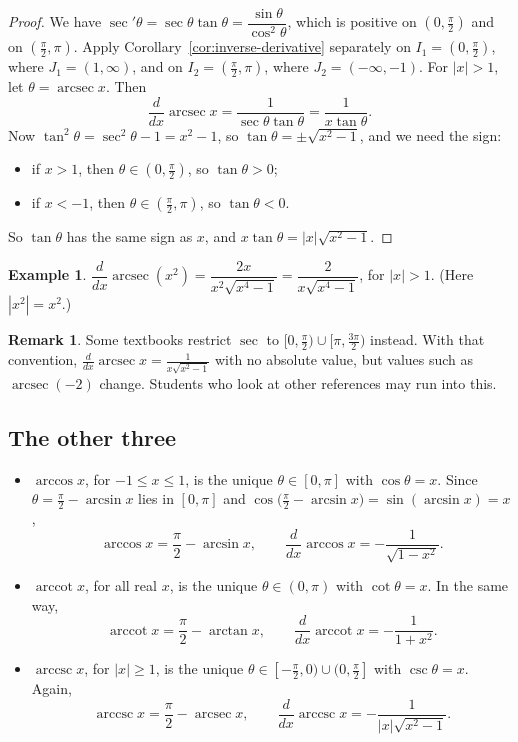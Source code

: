 \documentclass[12pt,letterpaper]{article}
\theoremstyle{definition}
\newtheorem{example}[theorem]{Example}
\newtheorem*{remark}{Remark}
\DeclareMathOperator{\arcsec}{arcsec}
\DeclareMathOperator{\arccot}{arccot}
\DeclareMathOperator{\arccsc}{arccsc}
\begin{document}
\begin{proof}
  We have $\sec'\theta=\sec\theta\tan\theta=\dfrac{\sin\theta}{\cos^2\theta}$,
  which is positive on $(0,\frac\pi2)$ and on $(\frac\pi2,\pi)$. Apply
  Corollary~\ref{cor:inverse-derivative} separately on $I_1=(0,\frac\pi2)$,
  where $J_1=(1,\infty)$, and on $I_2=(\frac\pi2,\pi)$, where
  $J_2=(-\infty,-1)$. For $|x|>1$, let $\theta=\arcsec x$. Then
  \[
    \frac{d}{dx}\arcsec x=\frac{1}{\sec\theta\tan\theta}
      =\frac{1}{x\tan\theta}.
  \]
  Now $\tan^2\theta=\sec^2\theta-1=x^2-1$, so
  $\tan\theta=\pm\sqrt{x^2-1}$, and we need the sign:
  \begin{itemize}[itemsep=0.2em]
    \item if $x>1$, then $\theta\in(0,\frac\pi2)$, so $\tan\theta>0$;
    \item if $x<-1$, then $\theta\in(\frac\pi2,\pi)$, so $\tan\theta<0$.
  \end{itemize}
  So $\tan\theta$ has the same sign as $x$, and
  $x\tan\theta=|x|\sqrt{x^2-1}$.
\end{proof}

\begin{example}
  $\dfrac{d}{dx}\arcsec(x^2)=\dfrac{2x}{x^2\sqrt{x^4-1}}
  =\dfrac{2}{x\sqrt{x^4-1}}$, for $|x|>1$. (Here $|x^2|=x^2$.)
\end{example}

\begin{remark}
  Some textbooks restrict $\sec$ to $[0,\frac\pi2)\cup[\pi,\frac{3\pi}{2})$
  instead. With that convention, $\frac{d}{dx}\arcsec x=\frac{1}{x\sqrt{x^2-1}}$
  with no absolute value, but values such as $\arcsec(-2)$ change. Students
  who look at other references may run into this.
\end{remark}

\subsection{The other three}

\begin{itemize}[itemsep=0.4em]
  \item $\arccos x$, for $-1\leq x\leq1$, is the unique $\theta\in[0,\pi]$
    with $\cos\theta=x$. Since $\theta=\frac\pi2-\arcsin x$ lies in $[0,\pi]$
    and $\cos\bigl(\frac\pi2-\arcsin x\bigr)=\sin(\arcsin x)=x$,
    \[
      \arccos x=\frac\pi2-\arcsin x,
      \qquad
      \frac{d}{dx}\arccos x=-\frac{1}{\sqrt{1-x^2}}.
    \]
  \item $\arccot x$, for all real $x$, is the unique $\theta\in(0,\pi)$ with
    $\cot\theta=x$. In the same way,
    \[
      \arccot x=\frac\pi2-\arctan x,
      \qquad
      \frac{d}{dx}\arccot x=-\frac{1}{1+x^2}.
    \]
  \item $\arccsc x$, for $|x|\geq1$, is the unique
    $\theta\in[-\frac\pi2,0)\cup(0,\frac\pi2]$ with $\csc\theta=x$. Again,
    \[
      \arccsc x=\frac\pi2-\arcsec x,
      \qquad
      \frac{d}{dx}\arccsc x=-\frac{1}{|x|\sqrt{x^2-1}}.
    \]
\end{itemize}
\end{document}
